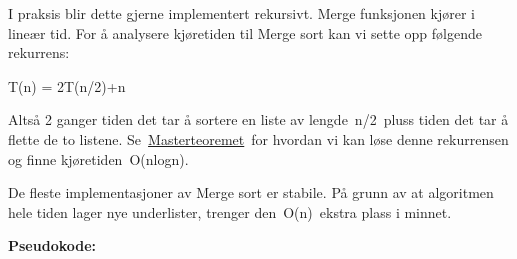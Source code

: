 \documentclass[12pt]{report}
\begin{document}
I praksis blir dette gjerne implementert rekursivt. Merge funksjonen kjører i lineær tid. For å analysere kjøretiden til Merge sort kan vi sette opp følgende rekurrens:\par

\begin{Center}
T(n) = 2T(n/2)+n
\end{Center}\par

\setlength{\parskip}{0.0pt}
Altså 2 ganger tiden det tar å sortere en liste av lengde n/2 pluss tiden det tar å flette de to listene. Se \href{https://www.wikipendium.no/TDT4120_Algoritmer_og_datastrukturer/nb/}{\textcolor[HTML]{006699}{Masterteoremet}} for hvordan vi kan løse denne rekurrensen og finne kjøretiden O(nlogn).\par

De fleste implementasjoner av Merge sort er stabile. På grunn av at algoritmen hele tiden lager nye underlister, trenger den O(n) ekstra plass i minnet.\par


\vspace{\baselineskip}
{\fontsize{13pt}{15.6pt}\selectfont \textbf{Pseudokode:}\par}\par
\end{document}
